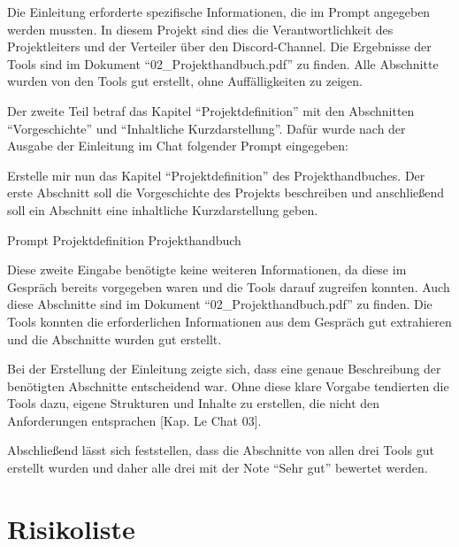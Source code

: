 Die Einleitung erforderte spezifische Informationen, die im Prompt angegeben werden mussten. In diesem Projekt sind 
dies die Verantwortlichkeit des Projektleiters und der Verteiler über den Discord-Channel. Die Ergebnisse der Tools 
sind im Dokument ``02\_Projekthandbuch.pdf'' zu finden. Alle Abschnitte wurden von den Tools gut erstellt, ohne 
Auffälligkeiten zu zeigen.

Der zweite Teil betraf das Kapitel ``Projektdefinition'' mit den Abschnitten ``Vorgeschichte'' und ``Inhaltliche Kurzdarstellung''. 
Dafür wurde nach der Ausgabe der Einleitung im Chat folgender Prompt eingegeben:

\begin{prompt}[H]
    \begin{tcolorbox}[colback=gray!20, colframe=gray!20, boxrule=0pt, sharp corners]
        Erstelle mir nun das Kapitel ``Projektdefinition'' des Projekthandbuches. Der erste Abschnitt soll die 
        Vorgeschichte des Projekts beschreiben und anschließend soll ein Abschnitt eine inhaltliche Kurzdarstellung 
        geben.
        \vfill
    \end{tcolorbox}
    \caption{Prompt Projektdefinition Projekthandbuch}
    \label{Prompt Projektdefinition Projekthandbuch}
\end{prompt}

\clearpage

Diese zweite Eingabe benötigte keine weiteren Informationen, da diese im Gespräch bereits vorgegeben waren und die 
Tools darauf zugreifen konnten. Auch diese Abschnitte sind im Dokument ``02\_Projekthandbuch.pdf'' zu finden. Die Tools 
konnten die erforderlichen Informationen aus dem Gespräch gut extrahieren und die Abschnitte wurden gut erstellt.

Bei der Erstellung der Einleitung zeigte sich, dass eine genaue Beschreibung der benötigten Abschnitte entscheidend war. 
Ohne diese klare Vorgabe tendierten die Tools dazu, eigene Strukturen und Inhalte zu erstellen, die nicht den 
Anforderungen entsprachen [Kap. Le Chat 03].

Abschließend lässt sich feststellen, dass die Abschnitte von allen drei Tools gut erstellt wurden und daher alle drei 
mit der Note ``Sehr gut'' bewertet werden.

\section{Risikoliste}  \label{CompRisikoliste}

